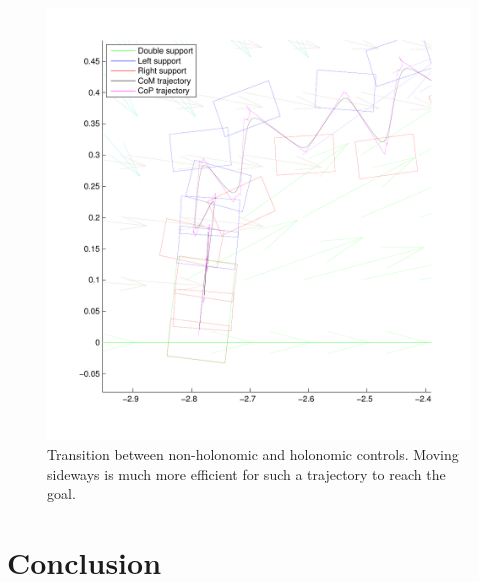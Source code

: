 \begin{figure}[ht]
\centering
\includegraphics[scale=0.55]{Chap5-Visual-Planning/steps11zoom.pdf}
\caption{Transition between non-holonomic and holonomic controls. Moving sideways is much more efficient for such a trajectory to reach the goal.}
\label{fig:steps11zoom}
\end{figure}


\section{Conclusion}
\label{sec:conclusion}

